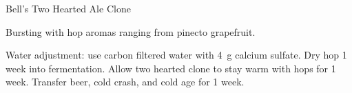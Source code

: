 \stylesection{\styleamericanipa}

\begin{recipe}{Bell's Two Hearted Ale Clone}

\begin{aboutblock}
Bursting with hop aromas ranging from pinecto grapefruit. \sourceaha
\end{aboutblock}


\begin{methodandtiming}
 
\begin{mashsteps}
\end{mashsteps}

\begin{directions}
Water adjustment: use carbon filtered water with 4~g calcium sulfate.
Dry hop 1 week into fermentation. Allow two hearted clone to stay warm with hops
for 1 week. Transfer beer, cold crash, and cold age for 1 week.
\end{directions}

\end{methodandtiming}

\recipebreak

\begin{ingredientsblock}

\begin{malts}
\end{malts}

\begin{hops}
\end{hops}


\end{ingredientsblock}

\end{recipe}

